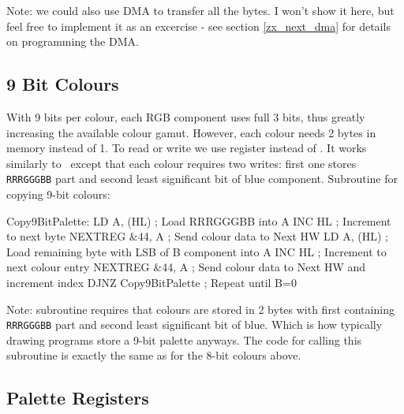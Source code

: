 Note: we could also use DMA to transfer all the bytes. I won't show it here, but feel free to implement it as an excercise - see section \ref{zx_next_dma} for details on programming the DMA.


\subsection{9 Bit Colours}

With 9 bits per colour, each RGB component uses full 3 bits, thus greatly increasing the available colour gamut. However, each colour needs 2 bytes in memory instead of 1. To read or write we use  register instead of . It works similarly to ~except that each colour requires two writes: first one stores {\tt RRRGGGBB} part and second least significant bit of blue component. Subroutine for copying 9-bit colours:

\begin{tcblisting}{}
Copy9BitPalette:
    LD A, (HL)                ; Load RRRGGGBB into A
    INC HL                    ; Increment to next byte
    NEXTREG &44, A            ; Send colour data to Next HW
    LD A, (HL)                ; Load remaining byte with LSB of B component into A
    INC HL                    ; Increment to next colour entry
    NEXTREG &44, A            ; Send colour data to Next HW and increment index
    DJNZ Copy9BitPalette      ; Repeat until B=0
\end{tcblisting}

Note: subroutine requires that colours are stored in 2 bytes with first containing {\tt RRRGGGBB} part and second least significant bit of blue. Which is how typically drawing programs store a 9-bit palette anyways. The code for calling this subroutine is exactly the same as for the 8-bit colours above.


\subsection{Palette Registers}
\label{zx_next_palette_registers}

\subsubsection{}

\begin{NextPort}
\end{NextPort}

